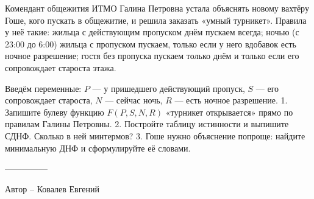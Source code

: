 \question
Комендант общежития ИТМО Галина Петровна устала объяснять новому вахтёру Гоше, кого пускать в общежитие, и решила заказать «умный турникет». Правила у неё такие: жильца с действующим пропуском днём пускаем всегда; ночью (с 23:00 до 6:00) жильца с пропуском пускаем, только если у него вдобавок есть ночное разрешение; гостя без пропуска пускаем только днём и только если его сопровождает староста этажа.

Введём переменные: $P$ — у пришедшего действующий пропуск, $S$ — его сопровождает староста, $N$ — сейчас ночь, $R$ — есть ночное разрешение.
1. Запишите булеву функцию $F(P, S, N, R)$ «турникет открывается» прямо по правилам Галины Петровны.
2. Постройте таблицу истинности и выпишите СДНФ. Сколько в ней минтермов?
3. Гоше нужно объяснение попроще: найдите минимальную ДНФ и сформулируйте её словами.

---------------

Автор -- Ковалев Евгений